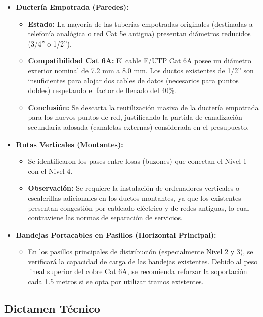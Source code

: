 \begin{itemize}
    \item \textbf{Ductería Empotrada (Paredes):}
    \begin{itemize}
        \item \textbf{Estado:} La mayoría de las tuberías empotradas originales (destinadas a telefonía analógica o red Cat 5e antigua) presentan diámetros reducidos (3/4'' o 1/2'').
        \item \textbf{Compatibilidad Cat 6A:} El cable F/UTP Cat 6A posee un diámetro exterior nominal de 7.2 mm a 8.0 mm. Los ductos existentes de 1/2'' son insuficientes para alojar dos cables de datos (necesarios para puntos dobles) respetando el factor de llenado del 40\%.
        \item \textbf{Conclusión:} Se descarta la reutilización masiva de la ductería empotrada para los nuevos puntos de red, justificando la partida de canalización secundaria adosada (canaletas externas) considerada en el presupuesto.
    \end{itemize}
    \item \textbf{Rutas Verticales (Montantes):}
    \begin{itemize}
        \item Se identificaron los pases entre losas (buzones) que conectan el Nivel 1 con el Nivel 4.
        \item \textbf{Observación:} Se requiere la instalación de ordenadores verticales o escalerillas adicionales en los ductos montantes, ya que los existentes presentan congestión por cableado eléctrico y de redes antiguas, lo cual contraviene las normas de separación de servicios.
    \end{itemize}
    \item \textbf{Bandejas Portacables en Pasillos (Horizontal Principal):}
    \begin{itemize}
        \item En los pasillos principales de distribución (especialmente Nivel 2 y 3), se verificará la capacidad de carga de las bandejas existentes. Debido al peso lineal superior del cobre Cat 6A, se recomienda reforzar la soportación cada 1.5 metros si se opta por utilizar tramos existentes.
    \end{itemize}
\end{itemize}

\subsection*{Dictamen Técnico}

